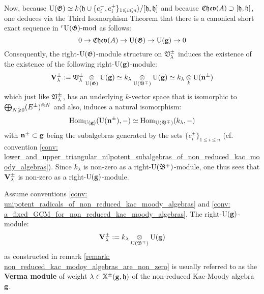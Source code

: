 \begin{remark}
                Now, because $\mathrm{U}(\mathfrak{G}) \simeq k\langle\mathfrak{h} \cup \{e_i^-, e_i^+\}_{1 \leqslant i \leqslant n}\rangle/[\mathfrak{h}, \mathfrak{h}]$ and because $\mathfrak{Chev}(A) \supset [\mathfrak{h}, \mathfrak{h}]$, one deduces via the Third Isomorphism Theorem that there is a canonical short exact sequence in ${}^r\mathrm{U}(\mathfrak{G})\text{-}\mathrm{mod}$ as follows:
                    $$0 \to \mathfrak{Chev}(A)\to \mathrm{U}(\mathfrak{G}) \to \mathrm{U}(\mathbf{g}) \to 0$$
                Consequently, the right-$\mathrm{U}(\mathfrak{G})$-module structure on $\mathfrak{V}_{\lambda}^{\pm}$ induces the existence of the existence of the following right-$\mathrm{U}(\mathbf{g})$-module:
                    $$\bfV_{\lambda}^{\pm} := \frakV_{\lambda}^{\pm} \tensor_{\rmU(\frakG)} \rmU(\bfg) \cong k_{\lambda}  \tensor_{\rmU(\frakB^{\mp})} \rmU(\bfg) \cong k_{\lambda} \tensor_k \rmU(\bfn^{\pm})$$
                which just like $\mathfrak{V}_{\lambda}^{\pm}$, has an underlying $k$-vector space that is isomorphic to $\bigoplus_{N \geq 0} (E^{\pm})^{\tensor N}$ and also, induces a natural isomorphism:
                    $$\mathrm{Hom}_{\mathrm{U}(\mathbf{g})}(\mathrm{U}(\mathbf{n}^{\pm}), -) \simeq \mathrm{Hom}_{\mathrm{U}(\mathfrak{B}^{\mp})}(k_{\lambda}, -)$$
                with $\mathbf{n}^{\pm} \subset \mathbf{g}$ being the subalgebras generated by the sets $\{e_i^{\pm}\}_{1 \leq i \leq n}$ (cf. convention \ref{conv: lower_and_upper_triangular_nilpotent_subalgebras_of_non_reduced_kac_moody_algebras}). Since $k_{\lambda}$ is non-zero as a right-$\mathrm{U}(\mathfrak{B}^{\mp})$-module, one thus sees that $\mathbf{V}_{\lambda}^{\pm}$ is non-zero as a right-$\mathrm{U}(\mathbf{g})$-module. 
            \end{remark}
            \begin{definition} \label{def: verma_modules_for_non_reduced_kac_moody_algebras}
                Assume conventions \ref{conv: unipotent_radicals_of_non_reduced_kac_moody_algebras} and \ref{conv: a_fixed_GCM_for_non_reduced_kac_moody_algebras}. The right-$\mathrm{U}(\mathbf{g})$-module:
                    $$\bfV_{\lambda}^{\pm} := k_{\lambda} \tensor_{\rmU(\frakB^{\mp})} \rmU(\bfg)$$
                as constructed in remark \ref{remark: non_reduced_kac_modoy_algebras_are_non_zero} is usually referred to as the \textbf{Verma module} of weight $\lambda \in \mathbb{X}^{\pm}(\mathbf{g}, \mathfrak{h})$ of the non-reduced Kac-Moody algebra $\mathbf{g}$.
            \end{definition}
